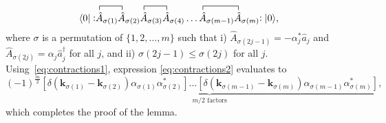 \documentclass[pra,nofootinbib,floats,aps,twocolumn,tightenlines,superscriptaddress]{revtex4-1}
\newcommand{\ket}[1]{| {#1} \rangle}
\newcommand{\bra}[1]{\langle {#1} |}
\newcommand{\ah}{\hat{a}}
\newcommand{\normord}[1]{:\mathrel{#1}:}
\begin{document}
\begin{equation}
\label{eq:contractions2}
    \bra{0}
    \normord{
    \contraction{}{\hat{A}}{{}_{\sigma(1)}}{\hat{A}}
    \contraction{\hat{A}_{\sigma(1)}
    \hat{A}_{\sigma(2)}}{\hat{A}}{{}_{\sigma(3)}}{\hat{A}}
    \contraction{\hat{A}_{\sigma(1)}
    \hat{A}_{\sigma(2)}
    \hat{A}_{\sigma(3)}
    \hat{A}_{\sigma(4)}
    \ldots}{\hat{A}}{{}_{\sigma(m-1)}}{\hat{A}}
    \hat{A}_{\sigma(1)}
    \hat{A}_{\sigma(2)}
    \hat{A}_{\sigma(3)}
    \hat{A}_{\sigma(4)}
    \ldots
    \hat{A}_{\sigma(m-1)}
    \hat{A}_{\sigma(m)}
    }
    \ket{0},
\end{equation}
where $\sigma$ is a permutation of $\{1,2,\ldots,m\}$ such that i) \mbox{$\hat{A}_{\sigma(2j-1)}=-\alpha_j^*\ah_j$} and \mbox{$\hat{A}_{\sigma(2j)}=\alpha_j\ah_j^\dagger$} for all $j$, and ii) \mbox{$\sigma(2j-1)\le \sigma(2j)$} for all $j$. Using~\eqref{eq:contractions1}, expression \eqref{eq:contractions2} evaluates to
\begin{equation}
    (-1)^\frac{m}{2}
    \underbrace{
    \left[\delta(\bm{k}_{\sigma(1)}-
    \bm{k}_{\sigma(2)})
    \alpha_{\sigma(1)}
    \alpha_{\sigma(2)}^*
    \right]
    \ldots
    \left[\delta(\bm{k}_{\sigma(m-1)}-
    \bm{k}_{\sigma(m)})
    \alpha_{\sigma(m-1)}
    \alpha_{\sigma(m)}^*
    \right]}_{m/2 \text{ factors}},
\end{equation}
which completes the proof of the lemma.
\end{document}
